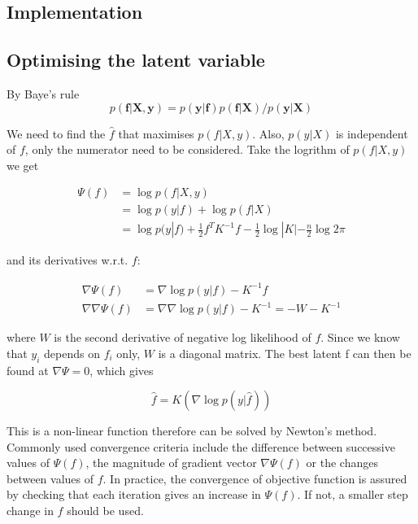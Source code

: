 \documentclass[11pt]{report}
\numberwithin{equation}{chapter}
\begin{document}
\begin{spacing}{2}
\section{Implementation}

\subsection{Optimising the latent variable}
By Baye's rule
\[
p(\boldsymbol f|\boldsymbol X,\boldsymbol y) = {p(\boldsymbol y|\boldsymbol f)p(\boldsymbol f|\boldsymbol X)}/{p(\boldsymbol y|\boldsymbol X)} 
\]

We need to find the $\hat{f}$ that maximises $p(f|X,y)$. Also, $p(y|X)$ is independent of $f$, only the numerator need to be considered. Take the logrithm of $p(f|X,y)$ we get

\begin{equation}
\begin{split}
\Psi(f) & = \operatorname{log}p(f|X,y) \\
& = \operatorname{log}p(y|f) + \operatorname{log}p(f|X) \\
& = \operatorname{log}p(y|f) + \frac{1}{2}f^TK^{-1}f - \frac{1}{2}\operatorname{log}|K| - \frac{n}{2}\operatorname{log}2\pi
\end{split}
\end{equation}

and its derivatives w.r.t. $f$:

\begin{align}
\nabla\Psi(f) & = \nabla\operatorname{log}p(y|f) - K^{-1}f \\
\nabla\nabla\Psi(f) & = \nabla\nabla\operatorname{log}p(y|f) - K^{-1} = -W - K^{-1}
\end{align}

where $W$ is the second derivative of negative log likelihood of $f$. Since we know that $y_i$ depends on $f_i$ only, $W$ is a diagonal matrix. The best latent f can then be found at $\nabla\Psi = 0$, which gives 

\begin{equation}
\label{optimised_f}
\hat{f} = K(\nabla \operatorname{log}p(y|\hat{f}))
\end{equation}

This is a non-linear function therefore can be solved by Newton's method. Commonly used convergence criteria include the difference between successive values of $\Psi (f)$, the magnitude of gradient vector $\nabla\Psi (f)$ or the changes between values of $f$. In practice, the convergence of objective function is assured by checking that each iteration gives an increase in $\Psi (f)$. If not, a smaller step change in $f$ should be used. 


\end{spacing}
\end{document}
